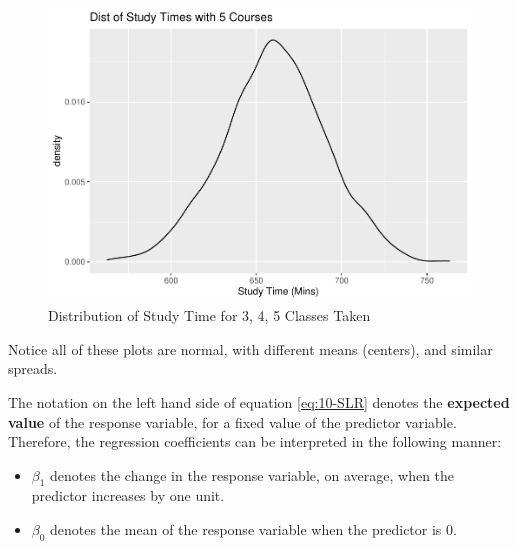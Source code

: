 \documentclass[
]{book}
\newenvironment{Shaded}{\begin{snugshade}}{\end{snugshade}}
\newcommand{\AttributeTok}[1]{\textcolor[rgb]{0.13,0.29,0.53}{#1}}
\newcommand{\DecValTok}[1]{\textcolor[rgb]{0.00,0.00,0.81}{#1}}
\newcommand{\DocumentationTok}[1]{\textcolor[rgb]{0.56,0.35,0.01}{\textbf{\textit{#1}}}}
\newcommand{\FloatTok}[1]{\textcolor[rgb]{0.00,0.00,0.81}{#1}}
\newcommand{\FunctionTok}[1]{\textcolor[rgb]{0.13,0.29,0.53}{\textbf{#1}}}
\newcommand{\NormalTok}[1]{#1}
\newcommand{\OtherTok}[1]{\textcolor[rgb]{0.56,0.35,0.01}{#1}}
\newcommand{\SpecialCharTok}[1]{\textcolor[rgb]{0.81,0.36,0.00}{\textbf{#1}}}
\newcommand{\StringTok}[1]{\textcolor[rgb]{0.31,0.60,0.02}{#1}}
\providecommand{\tightlist}{%
  \setlength{\itemsep}{0pt}\setlength{\parskip}{0pt}}
\begin{document}
\begin{Shaded}
\end{Shaded}

\begin{figure}
\centering
\includegraphics{bookdown-demo_files/figure-latex/10-conddist5-1.pdf}
\caption{\label{fig:10-conddist5}Distribution of Study Time for 3, 4, 5 Classes Taken}
\end{figure}

Notice all of these plots are normal, with different means (centers), and similar spreads.

The notation on the left hand side of equation \eqref{eq:10-SLR} denotes the \textbf{expected value} of the response variable, for a fixed value of the predictor variable. Therefore, the regression coefficients can be interpreted in the following manner:

\begin{itemize}
\tightlist
\item
  \(\beta_1\) denotes the change in the response variable, on average, when the predictor increases by one unit.
\item
  \(\beta_0\) denotes the mean of the response variable when the predictor is 0.
\end{itemize}
\end{document}
